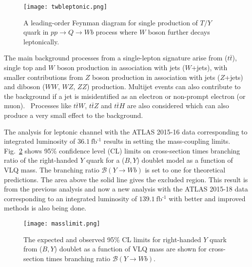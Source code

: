 \begin{figure}[hbt!]
	\centering
	\texttt{[image: twbleptonic.png]}
	\caption{A leading-order Feynman diagram for single production of $T/Y$ quark in $pp \rightarrow Q\rightarrow Wb$ process where $W$ boson further decays leptonically.}
	\label{fig:analysisstrategy:leptonicchannel}
\end{figure}

The main background processes from a single-lepton signature arise from ($t\bar{t}$), single top and $W$ boson production in association with jets ($W$+jets), with smaller contributions from $Z$ boson production in association with jets ($Z$+jets) and diboson ($WW$, $WZ$, $ZZ$) production. Multijet events can also contribute to the background if a jet is misidentified as an electron or non-prompt electron (or muon).~\cite{vlqpaper} Processes like $t\bar{t}W$, $t\bar{t}Z$ and $t\bar{t}H$ are also considered which can also produce a very small effect to the background.

The analysis for leptonic channel with the ATLAS 2015-16 data corresponding to integrated luminosity of $\SI{36.1}{\femto\barn^{\text{-1}}}$ results in setting the mass-coupling limits.~\cite{vlqpaper} Fig.\ \ref{fig:analysisstrategy:leptonicchannel:limit} shows 95\% confidence level (CL) limits on cross-section times branching ratio of the right-handed $Y$ quark for a ($B,Y$) doublet model as a function of VLQ mass. The branching ratio $\mathcal{B}(Y\rightarrow Wb)$ is set to one for theoretical predictions. The area above the solid line gives the excluded region. This result is from the previous analysis and now a new analysis with the ATLAS 2015-18 data corresponding to an integrated luminosity of $\SI{139.1}{\femto\barn^{\text{-1}}}$ with better and improved methods is also being done.


\begin{figure}[hbt!]
	\centering
	\texttt{[image: masslimit.png]}
	\caption{The expected and observed 95\% CL limits for right-handed $Y$ quark from ($B,Y$) doublet as a function of VLQ mass are shown for cross-section times branching ratio $\mathcal{B}(Y\rightarrow Wb)$.~\cite{vlqpaper}}
	\label{fig:analysisstrategy:leptonicchannel:limit}
\end{figure}

